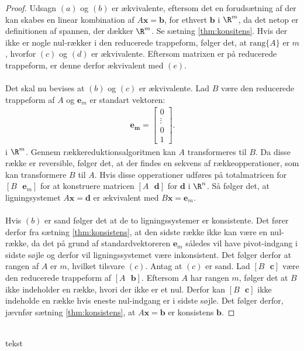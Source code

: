 \begin{proof}
%
Udsagn $(a)$ og $(b)$ er ækvivalente, eftersom det en forudsætning af der kan skabes en linear kombination af $A\mathbf{x} =\mathbf{b}$, for ethvert $\mathbf{b}$ i $\R^m$, da det netop er definitionen af spannen, der dækker $\R^m$.
Se sætning \ref{thm:konsitens}.
%
Hvis der ikke er nogle nul-rækker i den reducerede trappeform, følger det, at $\text{rang}\{A\}$ er $m$, hvorfor $(c)$ og $(d)$ er ækvivalente. 
Eftersom matrixen er på reducerede trappeform, er denne derfor ækvivalent med $(e)$.
\\\\
Det skal nu bevises at $(b)$ og $(c)$ er ækvivalente. 
Lad $B$ være den reducerede trappeform af $A$ og $\mathbf{e}_m$ er standart vektoren:
%
\begin{align*}
\mathbf{\mathbf{e}_m} = \begin{bmatrix}
		0 \\
        \vdots \\
        0 \\
        1 
\end{bmatrix}.
\end{align*}
%
i $\R^m$. 
Gennem rækkereduktionsalgoritmen kan $A$ transformeres til $B$. 
Da disse række er reversible, følger det, at der findes en sekvens af rækkeopperationer, som kan transformere $B$ til $A$.
Hvis disse opperationer udføres på totalmatricen for 
$[B \text{    } \mathbf{e}_m]$ 
for at konstruere matricen 
$[A \text{    } \mathbf{d}]$ 
for $\mathbf{d}$ i $\R^n$. 
Så følger det, at ligningsystemet $A\mathbf{x}=\mathbf{
d}$ er ækvivalent med $B\mathbf{x}=\mathbf{e}_m$.
\\\\
Hvis $(b)$ er sand følger det at de to ligningssystemer er konsistente. 
Det fører derfor fra sætning \ref{thm:konsistens}, at den sidste række ikke kan være en nul-række, da det på grund af standardvektoreren $\mathbf{e}_m$ således vil have pivot-indgang i sidste søjle og derfor vil ligningssystemet være inkonsistent.
Det følger derfor at rangen af $A$ er $m$, hvilket tilsvare $(c)$.
Antag at $(c)$ er sand. 
Lad $[B \text{    } \mathbf{c}]$ 
være den reducerede trappeform af 
$[A \text{    } \mathbf{b}]$.
Eftersom $A$ har rangen $m$, følger det at $B$ ikke indeholder en række, hvori der ikke er et nul.  
Derfor kan $[B \text{    } \mathbf{c}]$ ikke indeholde en række hvis eneste nul-indgang er i sidste søjle. 
Det følger derfor, jævnfør sætning \ref{thm:konsistens}, at $A\mathbf{x}=\mathbf{b}$ er konsistens $\mathbf{b}$.
%
\end{proof}
\\
%
tekst 
%

